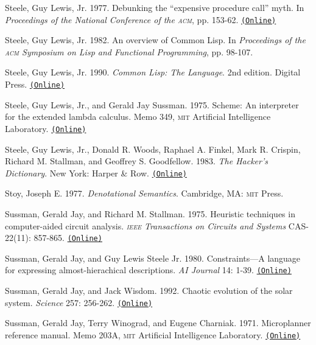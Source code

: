 \documentclass[oneside]{book}
\newcommand{\acronym}[1]{\textsc{\MakeLowercase{#1}}}
\newcommand{\code}[1]{\texttt{#1}}
\begin{document}
 \label{Steele 1977}
Steele, Guy Lewis, Jr.  1977.  Debunking the ``expensive procedure call'' myth.
In \textit{Proceedings of the National Conference of the \acronym{ACM}},
pp. 153-62.
\href{http://dspace.mit.edu/handle/1721.1/5753}{\code{(Online)}}

 \label{Steele 1982}
Steele, Guy Lewis, Jr.  1982.  An overview of Common Lisp.  In
\textit{Proceedings of the \acronym{ACM} Symposium on Lisp and Functional
Programming}, pp. 98-107.

 \label{Steele 1990}
Steele, Guy Lewis, Jr.  1990.  \textit{Common Lisp: The Language}. 2nd edition.
Digital Press.
\href{http://www.cs.cmu.edu/Groups/AI/html/cltl/cltl2.html}{\code{(Online)}}

 \label{Steele and Sussman 1975}
Steele, Guy Lewis, Jr., and Gerald Jay Sussman.  1975.  Scheme: An interpreter
for the extended lambda calculus.  Memo 349, \acronym{MIT} Artificial
Intelligence Laboratory.
\href{http://dspace.mit.edu/handle/1721.1/5794}{\code{(Online)}}

 \label{Steele et al. 1983}
Steele, Guy Lewis, Jr., Donald R. Woods, Raphael A. Finkel, Mark R.  Crispin,
Richard M. Stallman, and Geoffrey S. Goodfellow.  1983.  \textit{The Hacker's
Dictionary}. New York: Harper \& Row.
\href{http://www.dourish.com/goodies/jargon.html}{\code{(Online)}}

 \label{Stoy 1977}
Stoy, Joseph E.  1977.  \textit{Denotational Semantics}. Cambridge, MA:
\acronym{MIT} Press.

 \label{Sussman and Stallman 1975}
Sussman, Gerald Jay, and Richard M. Stallman.  1975.  Heuristic techniques in
computer-aided circuit analysis.  \textit{\acronym{IEEE} Transactions on Circuits
and Systems} CAS-22(11): 857-865.
\href{http://dspace.mit.edu/handle/1721.1/5803}{\code{(Online)}}

 \label{Sussman and Steele 1980}
Sussman, Gerald Jay, and Guy Lewis Steele Jr.  1980.  Constraints---A language
for expressing almost-hierachical descriptions.  \textit{AI Journal} 14: 1-39.
\href{http://dspace.mit.edu/handle/1721.1/6312}{\code{(Online)}}

 \label{Sussman and Wisdom 1992}
Sussman, Gerald Jay, and Jack Wisdom.  1992. Chaotic evolution of the solar
system.  \textit{Science} 257: 256-262.
\href{http://groups.csail.mit.edu/mac/users/wisdom/ss-chaos.pdf}{\code{(Online)}}

 \label{Sussman et al. (1971)}
Sussman, Gerald Jay, Terry Winograd, and Eugene Charniak.  1971.  Microplanner
reference manual.  Memo 203A, \acronym{MIT} Artificial Intelligence Laboratory.
\href{http://dspace.mit.edu/handle/1721.1/6184}{\code{(Online)}}
\end{document}
